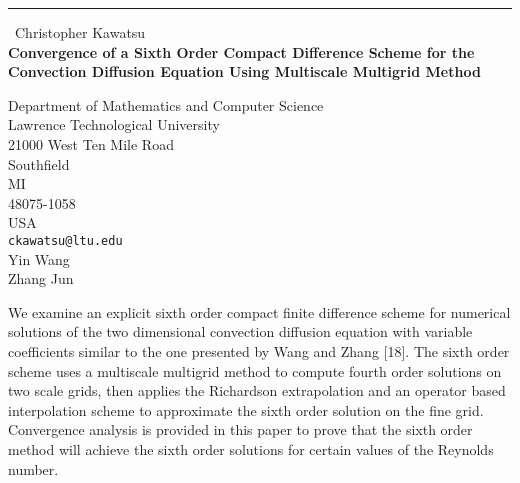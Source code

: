 \documentclass{report}
\begin{document}
\begin{center}
\rule{6in}{1pt} \
{\large Christopher Kawatsu \\
{\bf Convergence of a Sixth Order Compact Difference Scheme for the Convection Diffusion Equation Using Multiscale Multigrid Method}}

Department of Mathematics and Computer Science \\ Lawrence Technological University \\ 21000 West Ten Mile Road \\ Southfield \\ MI \\ 48075-1058 \\ USA
\\
{\tt ckawatsu@ltu.edu}\\
Yin Wang\\
Zhang Jun\end{center}

We examine an explicit sixth order compact finite difference scheme for
numerical solutions of the two dimensional convection diffusion equation
with variable coefficients similar to the one presented by Wang and Zhang
[18]. The sixth order scheme uses a multiscale multigrid method to
compute fourth order solutions on two scale grids, then applies the
Richardson extrapolation and an operator based interpolation scheme to
approximate the sixth order solution on the fine grid. Convergence
analysis is provided in this paper to prove that the sixth order method
will achieve the sixth order solutions for certain values of the Reynolds
number.
\end{document}
